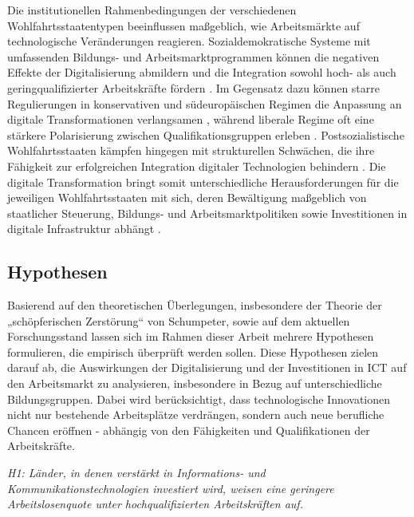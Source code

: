 Die institutionellen Rahmenbedingungen der verschiedenen Wohlfahrtsstaatentypen beeinflussen 
maßgeblich, wie Arbeitsmärkte auf technologische Veränderungen reagieren. Sozialdemokratische 
Systeme mit umfassenden Bildungs- und Arbeitsmarktprogrammen können die negativen Effekte der 
Digitalisierung abmildern und die Integration sowohl hoch- als auch geringqualifizierter 
Arbeitskräfte fördern \parencite[S. 27–30]{espingandersen1990thethree}. Im Gegensatz dazu können 
starre Regulierungen in konservativen und südeuropäischen Regimen die Anpassung an digitale 
Transformationen verlangsamen \parencite[S. 155]{ferrera1996thesouthern}, während 
liberale Regime oft eine stärkere Polarisierung zwischen Qualifikationsgruppen erleben 
\parencite[S. 3–5]{hall2001varieties}. Postsozialistische Wohlfahrtsstaaten kämpfen hingegen mit 
strukturellen Schwächen, die ihre Fähigkeit zur erfolgreichen Integration digitaler Technologien 
behindern \parencite[S. 88–93]{cerami2006socialpolicy}. Die digitale Transformation bringt somit 
unterschiedliche Herausforderungen für die jeweiligen Wohlfahrtsstaaten mit sich, deren Bewältigung 
maßgeblich von staatlicher Steuerung, Bildungs- und Arbeitsmarktpolitiken sowie Investitionen in 
digitale Infrastruktur abhängt \parencite[S. 23]{oecd2020digital}.



\subsection{Hypothesen}

Basierend auf den theoretischen Überlegungen, insbesondere der Theorie der „schöpferischen 
Zerstörung“ von Schumpeter, sowie auf dem aktuellen Forschungsstand lassen sich im Rahmen 
dieser Arbeit mehrere Hypothesen formulieren, die empirisch überprüft werden sollen. Diese 
Hypothesen zielen darauf ab, die Auswirkungen der Digitalisierung und der Investitionen in 
\ac{ICT} auf den Arbeitsmarkt zu analysieren, insbesondere in Bezug auf unterschiedliche 
Bildungsgruppen. Dabei wird berücksichtigt, dass technologische Innovationen nicht nur 
bestehende Arbeitsplätze verdrängen, sondern auch neue berufliche Chancen eröffnen - abhängig 
von den Fähigkeiten und Qualifikationen der Arbeitskräfte.

\textit{H1: Länder, in denen verstärkt in Informations- und Kommunikationstechnologien 
investiert wird, weisen eine geringere Arbeitslosenquote unter hochqualifizierten Arbeitskräften 
auf.}


